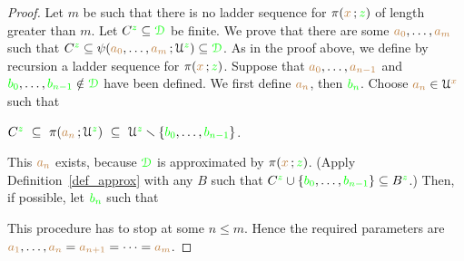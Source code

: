 \begin{proof}
Let $m$ be such that there is no ladder sequence for $\pi({\color{brown} x}\,;{\color{green} z})$ of length greater than $m$.
Let $C^{\color{green} z}\subseteq{\color{green}\EuScript D}$ be finite.
We prove that there are some ${\color{brown} a_0},\dots,{\color{brown} a_m}$ such that $C^{\color{green} z}\subseteq\psi({\color{brown} a_0},\dots,{\color{brown} a_m}\,;\EuScript U^{\color{green} z})\subseteq{\color{green}\EuScript D}$.
As in the proof above, we define by recursion a ladder sequence for $\pi({\color{brown} x}\,;{\color{green} z})$.
Suppose that ${\color{brown} a_0},\dots,{\color{brown} a_{n-1}}$ and ${\color{green} b_0},\dots,{\color{green} b_{n-1}}\notin{\color{green}\EuScript D}$ have been defined.
We first define ${\color{brown} a_n}$, then ${\color{green} b_n}$. 
Choose ${\color{brown} a_n}\in\EuScript U^{\color{brown} x}$ such that 

\hfil$C^{\color{green} z}\ \subseteq\ \pi({\color{brown} a_n}\,;\EuScript U^{\color{green} z})\ \subseteq\ \EuScript U^{\color{green} z}\smallsetminus\{{\color{green} b_0},\dots,{\color{green} b_{n-1}}\}$.

This ${\color{brown} a_n}$ exists, because ${\color{green}\EuScript D}$ is approximated by $\pi({\color{brown} x}\,;{\color{green} z})$.
(Apply Definition~\ref{def_approx} with any $B$ such that $C^{\color{green} z}\cup\{{\color{green} b_0},\dots,{\color{green} b_{n-1}}\}\subseteq B^{\color{green} z}$.)
Then, if possible, let ${\color{green} b_n}$ such that


This procedure has to stop at some $n\le m$.
Hence the required parameters are ${\color{brown} a_1},\dots,{\color{brown} a_n}={\color{brown} a_{n+1}}=\dots={\color{brown} a_{m}}$.
\end{proof}






